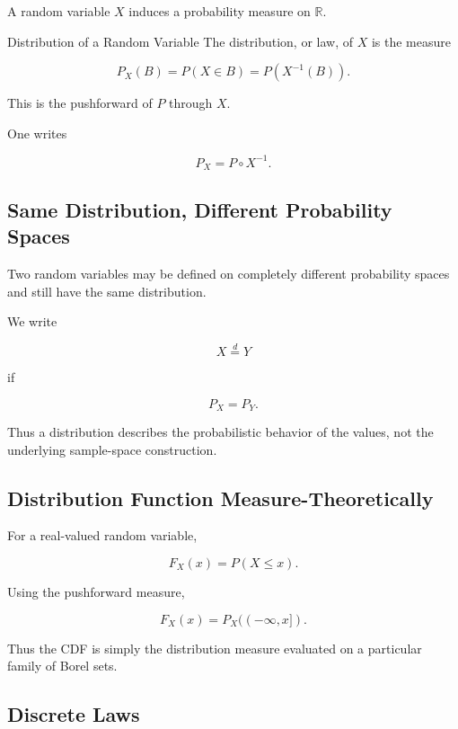 A random variable \(X\) induces a probability measure on
\(\mathbb{R}\).

\begin{definitionbox}{Distribution of a Random Variable}
The distribution, or law, of \(X\) is the measure

\[
\boxed{
P_X(B)
=
P(X\in B)
=
P(X^{-1}(B)).
}
\]
\end{definitionbox}

This is the pushforward of \(P\) through \(X\).

One writes

\[
\boxed{
P_X
=
P\circ X^{-1}.
}
\]

\subsection{Same Distribution, Different Probability Spaces}
\label{subsec:same-law-different-spaces}

Two random variables may be defined on completely different probability
spaces and still have the same distribution.

We write

\[
\boxed{
X\overset{d}{=}Y
}
\]

if

\[
P_X=P_Y.
\]

Thus a distribution describes the probabilistic behavior of the values,
not the underlying sample-space construction.

\subsection{Distribution Function Measure-Theoretically}
\label{subsec:cdf-measure-theoretic}

For a real-valued random variable,

\[
F_X(x)
=
P(X\leq x).
\]

Using the pushforward measure,

\[
\boxed{
F_X(x)
=
P_X((-\infty,x]).
}
\]

Thus the CDF is simply the distribution measure evaluated on a
particular family of Borel sets.

\subsection{Discrete Laws}
\label{subsec:discrete-laws-measure}


